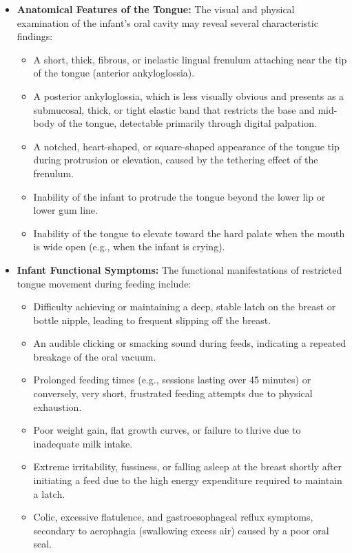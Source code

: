\begin{itemize}
  \item \textbf{Anatomical Features of the Tongue:} The visual and physical examination of the infant's oral cavity may reveal several characteristic findings:
    \begin{itemize}
      \item A short, thick, fibrous, or inelastic lingual frenulum attaching near the tip of the tongue (anterior ankyloglossia).
      \item A posterior ankyloglossia, which is less visually obvious and presents as a submucosal, thick, or tight elastic band that restricts the base and mid-body of the tongue, detectable primarily through digital palpation.
      \item A notched, heart-shaped, or square-shaped appearance of the tongue tip during protrusion or elevation, caused by the tethering effect of the frenulum.
      \item Inability of the infant to protrude the tongue beyond the lower lip or lower gum line.
      \item Inability of the tongue to elevate toward the hard palate when the mouth is wide open (e.g., when the infant is crying).
    \end{itemize}
  \item \textbf{Infant Functional Symptoms:} The functional manifestations of restricted tongue movement during feeding include:
    \begin{itemize}
      \item Difficulty achieving or maintaining a deep, stable latch on the breast or bottle nipple, leading to frequent slipping off the breast.
      \item An audible clicking or smacking sound during feeds, indicating a repeated breakage of the oral vacuum.
      \item Prolonged feeding times (e.g., sessions lasting over 45 minutes) or conversely, very short, frustrated feeding attempts due to physical exhaustion.
      \item Poor weight gain, flat growth curves, or failure to thrive due to inadequate milk intake.
      \item Extreme irritability, fussiness, or falling asleep at the breast shortly after initiating a feed due to the high energy expenditure required to maintain a latch.
      \item Colic, excessive flatulence, and gastroesophageal reflux symptoms, secondary to aerophagia (swallowing excess air) caused by a poor oral seal.

\end{itemize}
\end{itemize}
